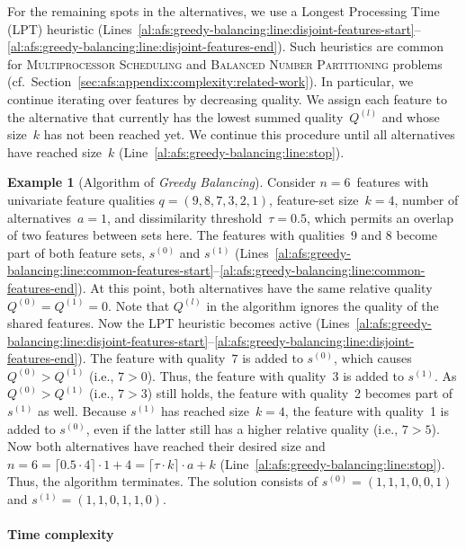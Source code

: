 \documentclass{article}
\theoremstyle{definition}
\newtheorem{example}{Example}
\begin{document}
For the remaining spots in the alternatives, we use a Longest Processing Time (LPT) heuristic (Lines~\ref{al:afs:greedy-balancing:line:disjoint-features-start}--\ref{al:afs:greedy-balancing:line:disjoint-features-end}).
Such heuristics are common for \textsc{Multiprocessor Scheduling} and \textsc{Balanced Number Partitioning} problems~\cite{babel1998thek, chen20023partitioning, lawrinenko2018reduction} (cf.~Section~\ref{sec:afs:appendix:complexity:related-work}).
In particular, we continue iterating over features by decreasing quality.
We assign each feature to the alternative that currently has the lowest summed quality~$Q^{(l)}$ and whose size~$k$ has not been reached yet.
We continue this procedure until all alternatives have reached size~$k$ (Line~\ref{al:afs:greedy-balancing:line:stop}).
%
\begin{example}[Algorithm of \emph{Greedy Balancing}]
	Consider $n=6$~features with univariate feature qualities $q = (9,8,7,3,2,1)$, feature-set size~$k=4$, number of alternatives~$a=1$, and dissimilarity threshold~$\tau = 0.5$, which permits an overlap of two features between sets here.
	The features with qualities~$9$ and $8$ become part of both feature sets, $s^{(0)}$ and $s^{(1)}$ (Lines~\ref{al:afs:greedy-balancing:line:common-features-start}--\ref{al:afs:greedy-balancing:line:common-features-end}).
	At this point, both alternatives have the same relative quality $Q^{(0)} = Q^{(1)} = 0$.
	Note that $Q^{(l)}$ in the algorithm ignores the quality of the shared features.
	Now the LPT heuristic becomes active (Lines~\ref{al:afs:greedy-balancing:line:disjoint-features-start}--\ref{al:afs:greedy-balancing:line:disjoint-features-end}).
	The feature with quality~$7$ is added to $s^{(0)}$, which causes $Q^{(0)} > Q^{(1)}$ (i.e., $7 > 0$).
	Thus, the feature with quality~3 is added to $s^{(1)}$.
	As $Q^{(0)} > Q^{(1)}$ (i.e., $7 > 3$) still holds, the feature with quality~2 becomes part of $s^{(1)}$ as well.
	Because $s^{(1)}$ has reached size~$k = 4$, the feature with quality~1 is added to $s^{(0)}$, even if the latter still has a higher relative quality (i.e., $7 > 5$).
	Now both alternatives have reached their desired size and $n = 6 = \lceil 0.5 \cdot 4 \rceil \cdot 1 + 4 = \lceil \tau \cdot k \rceil \cdot a + k$ (Line~\ref{al:afs:greedy-balancing:line:stop}).
	Thus, the algorithm terminates.
	The solution consists of $s^{(0)} = (1,1,1,0,0,1)$ and $s^{(1)} = (1,1,0,1,1,0)$.
	\label{ex:afs:greedy-balancing:algorithm}
\end{example}

\paragraph{Time complexity}
\end{document}
